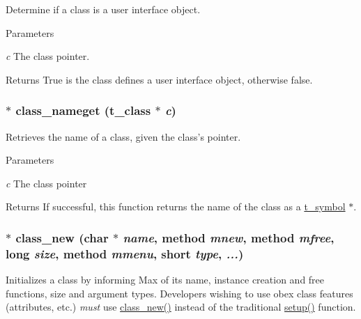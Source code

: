 Determine if a class is a user interface object. 
\begin{DoxyParams}{Parameters}
\item[{\em c}]The class pointer. \end{DoxyParams}
\begin{DoxyReturn}{Returns}
True is the class defines a user interface object, otherwise false. 
\end{DoxyReturn}
\hypertarget{group__class_ga32dab29dac27195676d8edfed8e04798}{
\subsubsection[{class\_\-nameget}]{$\ast$ class\_\-nameget ({\bf t\_\-class} $\ast$ {\em c})}}
\label{group__class_ga32dab29dac27195676d8edfed8e04798}


Retrieves the name of a class, given the class's pointer. 
\begin{DoxyParams}{Parameters}
\item[{\em c}]The class pointer \end{DoxyParams}
\begin{DoxyReturn}{Returns}
If successful, this function returns the name of the class as a \hyperlink{structt__symbol}{t\_\-symbol} $\ast$. 
\end{DoxyReturn}
\hypertarget{group__class_ga238696d466081965c2b72b3880358404}{
\subsubsection[{class\_\-new}]{$\ast$ class\_\-new (char $\ast$ {\em name}, \/  {\bf method} {\em mnew}, \/  {\bf method} {\em mfree}, \/  long {\em size}, \/  {\bf method} {\em mmenu}, \/  short {\em type}, \/   {\em ...})}}
\label{group__class_ga238696d466081965c2b72b3880358404}


Initializes a class by informing Max of its name, instance creation and free functions, size and argument types. Developers wishing to use obex class features (attributes, etc.) {\itshape must\/} use \hyperlink{group__class_ga238696d466081965c2b72b3880358404}{class\_\-new()} instead of the traditional \hyperlink{group__class__old_ga24bbc5a9e8f7bb0a1c6847326e2f0a20}{setup()} function.


